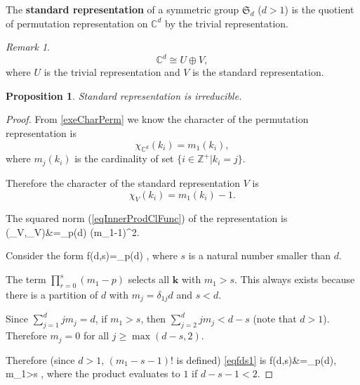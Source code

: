 \documentclass[12pt, letterpaper]{article}
\newcommand{\inte}{\mathbb{Z}}
\newcommand{\co}{\mathbb{C}}
\newenvironment{eqlong}{\equation\aligned}{\endaligned\endequation}
\newtheorem{prop}{Proposition}[section]
\theoremstyle{definition}
\theoremstyle{remark}
\newtheorem*{rem*}{Remark}
\theoremstyle{definition}
\theoremstyle{plain}
\numberwithin{equation}{section}
\begin{document}
	\begin{def*}
		The \textbf{standard representation} of a symmetric group $\mathfrak{S}_d$ ($d>1$)
		is the quotient of permutation representation on $\co^d$
		by the trivial representation.
	\end{def*}
	\begin{rem*}
		\[\co^d \cong U \oplus V, \]
		where $U$ is the trivial representation
		and $V$ is the standard representation.
	\end{rem*}
	\begin{prop}\label{propIrrStdRep}
		Standard representation is irreducible.
	\end{prop}
	\begin{proof}
		From \ref{exeCharPerm} we know the character of the permutation representation is
		\[\chi_{\co^d}(k_i) = m_1(k_i), \]
		where $m_j(k_i)$ is the cardinality of set $\{i\in\inte^+|k_i=j\}$.
		
		Therefore the character of the standard representation $V$ is
		\begin{equation}
			\chi_V(k_i)=m_1(k_i)-1.
		\end{equation}
	
		The squared norm (\ref{eqInnerProdClFunc}) of the representation is
		\begin{eqlong}\label{eqchiVchiV}
			(\chi_V,\chi_V)&=\sum_{\in p(d)}  (m_1-1)^2.\\
		\end{eqlong}
	
		Consider the form
		\begin{eqlong}\label{eqfds1}
			f(d,s)=\sum_{\in p(d)} \left[\frac{1}{\prod_{j=1}^d j^{m_j}m_j! } \prod_{r=0}^s(m_1-r)\right],
		\end{eqlong}
		where $s$ is a natural number smaller than $d$.
		
		The term $\prod_{r=0}^s(m_1-p)$ selects all $\mathbf{k}$ with $m_1>s$.
		This always exists because there is a partition of $d$ with $m_j=\delta_{1j} d$ and $s<d$.
				
		
		Since $\sum_{j=1}^{d}jm_j=d$, if $m_1>s$, then $\sum_{j=2}^{d}jm_j<d-s$ (note that $d>1$).
		Therefore $m_j=0$ for all $j\ge\max(d-s,2)$.
		
		Therefore (since $d>1$, $(m_1-s-1)!$ is defined) \eqref{eqfds1} is
		\begin{eqlong}\label{eqfds2}
			f(d,s)&=\sum_{\in p(d), m_1>s} \left[\frac{1}{(m_1-s-1)!\prod_{j=2}^{d-s-1} j^{m_j}m_j! } \right],
		\end{eqlong}
		where the product evaluates to $1$ if $d-s-1<2$.
		

\end{proof}
\end{document}

